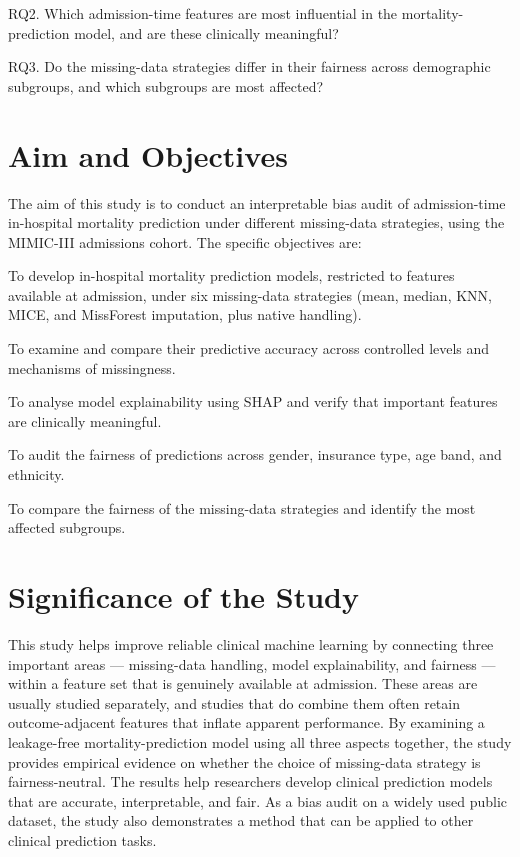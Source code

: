 \documentclass[12pt,a4paper]{report}
\begin{document}
RQ2. Which admission-time features are most influential in the mortality-prediction model, and are these clinically meaningful?

RQ3. Do the missing-data strategies differ in their fairness across demographic subgroups, and which subgroups are most affected?


\section{Aim and Objectives}
The aim of this study is to conduct an interpretable bias audit of admission-time in-hospital mortality prediction under different missing-data strategies, using the MIMIC-III admissions cohort. The specific objectives are:

To develop in-hospital mortality prediction models, restricted to features available at admission, under six missing-data strategies (mean, median, KNN, MICE, and MissForest imputation, plus native handling).

To examine and compare their predictive accuracy across controlled levels and mechanisms of missingness.

To analyse model explainability using SHAP and verify that important features are clinically meaningful.

To audit the fairness of predictions across gender, insurance type, age band, and ethnicity.

To compare the fairness of the missing-data strategies and identify the most affected subgroups.


\section{Significance of the Study}
This study helps improve reliable clinical machine learning by connecting three important areas --- missing-data handling, model explainability, and fairness --- within a feature set that is genuinely available at admission. These areas are usually studied separately, and studies that do combine them often retain outcome-adjacent features that inflate apparent performance. By examining a leakage-free mortality-prediction model using all three aspects together, the study provides empirical evidence on whether the choice of missing-data strategy is fairness-neutral. The results help researchers develop clinical prediction models that are accurate, interpretable, and fair. As a bias audit on a widely used public dataset, the study also demonstrates a method that can be applied to other clinical prediction tasks.
\end{document}
